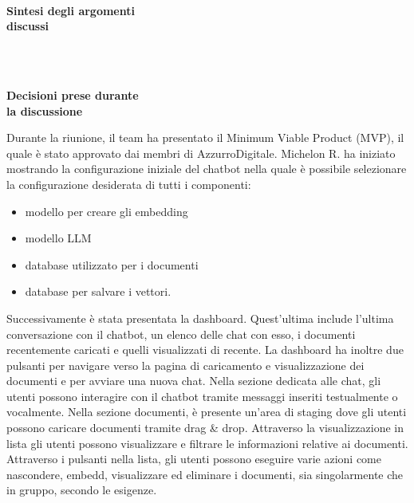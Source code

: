\documentclass[10pt, a4paper]{article}
\title{\data}
\author{SWEetCode}
\begin{document}


\setlength{\columnsep}{2.2em}
\setlength{\columnseprule}{4pt}
\begin{paracol}{2}


\intestazione
\vspace{5.0em}

\partecipanti

\newpage

\switchcolumn
\revisioneAzioni
\vspace{19.5em}

\ordineGiorno

\newpage


\switchcolumn

\\
\textbf{Sintesi degli argomenti\\discussi}

~\newpage
~\vspace{15.0em}


\\
\textbf{Decisioni prese durante\\la discussione}

\switchcolumn

Durante la riunione, il team ha presentato il Minimum Viable Product (MVP), il quale è stato approvato dai membri di AzzurroDigitale. Michelon R. ha iniziato mostrando la configurazione iniziale del chatbot nella quale è possibile selezionare la configurazione desiderata di tutti i componenti:
\begin{itemize}
\item modello per creare gli embedding
\item modello LLM
\item database utilizzato per i documenti
\item database per salvare i vettori. 
\end{itemize}
Successivamente è stata presentata la dashboard. Quest'ultima include l'ultima conversazione con il chatbot, un elenco delle chat con esso, i documenti recentemente caricati e quelli visualizzati di recente. La dashboard ha inoltre due pulsanti per navigare verso la pagina di caricamento e visualizzazione dei documenti e per avviare una nuova chat.
Nella sezione dedicata alle chat, gli utenti possono interagire con il chatbot tramite messaggi inseriti testualmente o vocalmente. Nella sezione documenti, è presente un'area di staging dove gli utenti possono caricare documenti tramite drag \& drop. Attraverso la visualizzazione in lista gli utenti possono visualizzare e filtrare le informazioni relative ai documenti. 
Attraverso i pulsanti nella lista, gli utenti possono eseguire varie azioni come nascondere, embedd, visualizzare ed eliminare i documenti, sia singolarmente che in gruppo, secondo le esigenze.
\discussione


\end{paracol}
\end{document}
